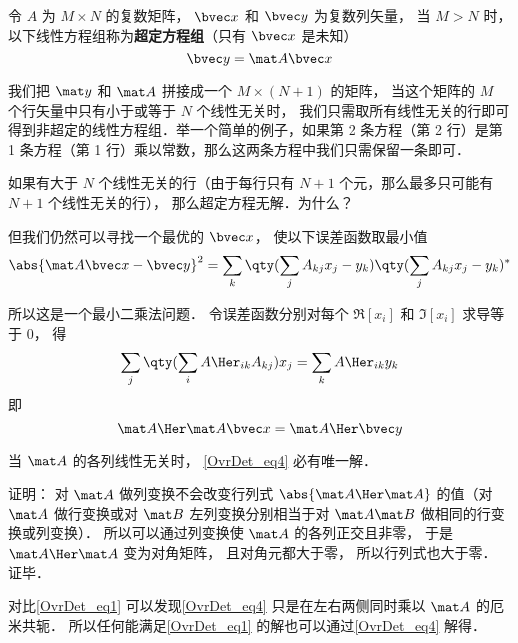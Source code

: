 

令 $A$ 为 $M\times N$ 的复数矩阵， $\bvec x$ 和 $\bvec y$ 为复数列矢量， 当 $M > N$ 时， 以下线性方程组称为\textbf{超定方程组}（只有 $\bvec x$ 是未知）
\begin{equation}\label{OvrDet_eq1}
\bvec y = \mat A \bvec x
\end{equation}

我们把 $\mat y$ 和 $\mat A$ 拼接成一个 $M\times(N+1)$ 的矩阵， 当这个矩阵的 $M$ 个行矢量中只有小于或等于 $N$ 个线性无关时， 我们只需取所有线性无关的行即可得到非超定的线性方程组．举一个简单的例子，如果第 2 条方程（第 2 行）是第 1 条方程（第 1 行）乘以常数，那么这两条方程中我们只需保留一条即可．

如果有大于 $N$ 个线性无关的行（由于每行只有 $N+1$ 个元，那么最多只可能有 $N+1$ 个线性无关的行）， 那么超定方程无解．为什么？

但我们仍然可以寻找一个最优的 $\bvec x$， 使以下误差函数取最小值
\begin{equation}
\abs{\mat A\bvec x - \bvec y}^2 =  \sum_k  \qty(\sum_j A_{kj} x_j - y_k) \qty(\sum_j A_{kj} x_j - y_k)^*
\end{equation}

所以这是一个最小二乘法问题． 令误差函数分别对每个 $\Re[x_i]$ 和 $\Im[x_i]$ 求导等于 0， 得
\begin{equation}
\sum_j \qty(\sum_i A\Her_{ik} A_{kj}) x_j = \sum_k A\Her_{ik} y_k
\end{equation}
即
\begin{equation}\label{OvrDet_eq4}
\mat A\Her \mat A \bvec x = \mat A\Her \bvec y
\end{equation}

\begin{theorem}{}\label{OvrDet_the1}
当 $\mat A$ 的各列线性无关时， \autoref{OvrDet_eq4} 必有唯一解．
\end{theorem}

证明： 对 $\mat A$ 做列变换不会改变行列式 $\abs{\mat A\Her \mat A}$ 的值（对 $\mat A$ 做行变换或对 $\mat B$ 左列变换分别相当于对 $\mat A\mat B$ 做相同的行变换或列变换）． 所以可以通过列变换使 $\mat A$ 的各列正交且非零， 于是 $\mat A\Her \mat A$ 变为对角矩阵， 且对角元都大于零， 所以行列式也大于零． 证毕．

对比\autoref{OvrDet_eq1} 可以发现\autoref{OvrDet_eq4} 只是在左右两侧同时乘以 $\mat A$ 的厄米共轭． 所以任何能满足\autoref{OvrDet_eq1} 的解也可以通过\autoref{OvrDet_eq4} 解得．

